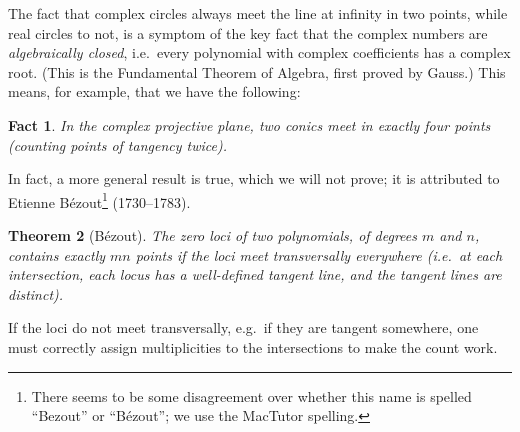 \documentclass[12pt]{book}
\numberwithin{exc}{section}
\numberwithin{figure}{section}
\newtheorem{theorem}{Theorem}[section]
\newtheorem{fact}[theorem]{Fact}
\numberwithin{equation}{theorem}
\begin{document}
The fact that complex circles always meet the line at infinity in two 
points, while real circles to not, is a symptom of the key fact that
the complex numbers are \emph{algebraically closed}, 
 i.e.\ every 
polynomial with complex coefficients has a complex root. (This is the 
Fundamental Theorem of Algebra, first proved by Gauss.) 
This means, 
for example, that we have the following:
\begin{fact}
In the complex projective plane,
two conics meet in exactly four points (counting points of tangency 
twice).
\end{fact}
In fact, a more general result is true, which we will not prove; it is
attributed to Etienne B\'ezout\footnote{There seems to be some disagreement
over whether this name is spelled ``Bezout'' or ``B\'ezout''; we use the MacTutor
spelling.}
(1730--1783). 
\begin{theorem}[B\'ezout]
The zero loci 
of two polynomials, of degrees $m$ and $n$, contains exactly $mn$ 
points if the loci meet transversally everywhere (i.e.\ at each 
intersection, each locus has a well-defined tangent line, and the tangent 
lines are distinct).
\end{theorem}
If the loci do not meet transversally, e.g.\ if they are tangent 
somewhere, one must correctly assign multiplicities to the 
intersections to make the count work.
\end{document}
